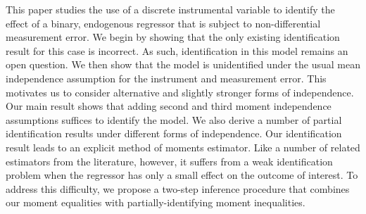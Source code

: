 This paper studies the use of a discrete instrumental variable to identify the effect of a binary, endogenous regressor that is subject to non-differential measurement error.
We begin by showing that the only existing identification result for this case is incorrect.
As such, identification in this model remains an open question.
We then show that the model is unidentified under the usual mean independence assumption for the instrument and measurement error.
This motivates us to consider alternative and slightly stronger forms of independence.
Our main result shows that adding second and third moment independence assumptions suffices to identify the model.
We also derive a number of partial identification results under different forms of independence. 
Our identification result leads to an explicit method of moments estimator. 
Like a number of related estimators from the literature, however, it suffers from a weak identification problem when the regressor has only a small effect on the outcome of interest. 
To address this difficulty, we propose a two-step inference procedure that combines our moment equalities with partially-identifying moment inequalities.
